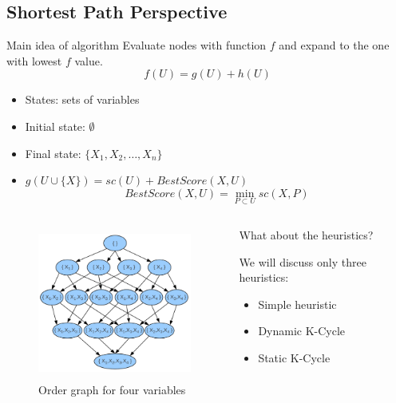 \subsection{Shortest Path Perspective}

\begin{frame}
	\begin{block}{Main idea of algorithm}
		Evaluate nodes with function $f$ and expand to the one with lowest $f$ value.
			\[ f( U ) = g( U ) + h( U ) \]
	\end{block}
	\begin{itemize}
		\item States: sets of variables
		\item Initial state: $\emptyset$
		\item Final state: $\{ X_1 , X_2 , \ldots , X_n \}$
		\item $g( U \cup \{ X \} ) = {sc}( U ) + BestScore( X , U )$
			\[ BestScore( X , U ) = \min_{P \subset U} {sc}( X , P ) \]
	\end{itemize}
\end{frame}

\begin{frame}[fragile]
	
\end{frame}

\begin{frame}
	\begin{columns}
		\begin{column}{.48\textwidth}
		\begin{figure}
			\centering
			\includegraphics[height=5cm]{./images/order_graph}
			\caption{Order graph for four variables}
		\end{figure}
		\end{column}
		\pause
		\begin{column}{.48\textwidth}
			\begin{center}
				\large
				What about the \alert{heuristics}?
			\end{center}
			\pause
			We will discuss only three heuristics:
			\begin{itemize}
				\item Simple heuristic
				\item Dynamic K-Cycle
				\item Static K-Cycle
			\end{itemize}
		\end{column}
	\end{columns}
\end{frame}